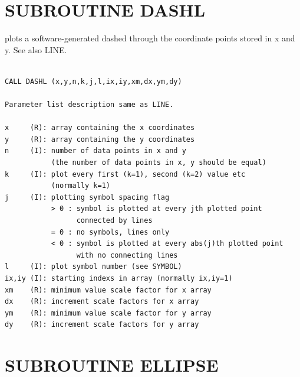 \documentclass[11pt]{report}
\begin{document}
\section{SUBROUTINE DASHL }

 plots a software-generated dashed   through the coordinate points
stored in x and y.  See also LINE.
\begin{verbatim}

CALL DASHL (x,y,n,k,j,l,ix,iy,xm,dx,ym,dy)

Parameter list description same as LINE.

x     (R): array containing the x coordinates
y     (R): array containing the y coordinates
n     (I): number of data points in x and y
           (the number of data points in x, y should be equal)
k     (I): plot every first (k=1), second (k=2) value etc
           (normally k=1)
j     (I): plotting symbol spacing flag
           > 0 : symbol is plotted at every jth plotted point
                 connected by lines
           = 0 : no symbols, lines only
           < 0 : symbol is plotted at every abs(j)th plotted point
                 with no connecting lines
l     (I): plot symbol number (see SYMBOL)
ix,iy (I): starting indexs in array (normally ix,iy=1)
xm    (R): minimum value scale factor for x array
dx    (R): increment scale factors for x array
ym    (R): minimum value scale factor for y array
dy    (R): increment scale factors for y array
\end{verbatim}

\section{SUBROUTINE ELLIPSE}
\end{document}
